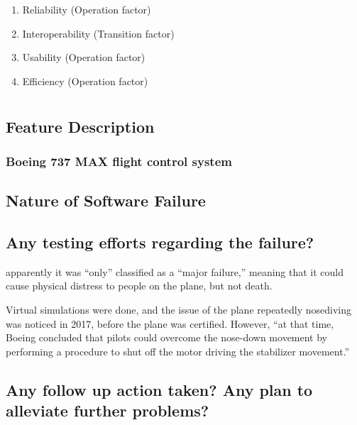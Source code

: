 \documentclass[letterpaper]{article}
\begin{document}
\begin{enumerate}
	\item Reliability (Operation factor)
	\item Interoperability (Transition factor)
	\item Usability (Operation factor)
	\item Efficiency (Operation factor)
\end{enumerate}

\section{}


	\subsection*{Feature Description}

	\subsubsection*{Boeing 737 MAX flight control system}

	\subsection*{Nature of Software Failure}

	\subsection*{Any testing efforts regarding the failure?}
	apparently it was ``only'' classified as a “major failure,” meaning that it could cause physical distress to people on the plane, but not death. 
	\cite{gates_2019}

	Virtual simulations were done, and the issue of the plane repeatedly nosediving was noticed in 2017, before the plane was certified. 
	However, ``at that time, Boeing concluded that pilots could overcome the nose-down movement by performing a procedure to shut off the motor driving the stabilizer movement.''\cite{bloomberg}
	

	\subsection*{Any follow up action taken? Any plan to alleviate further problems?}
\end{document}
